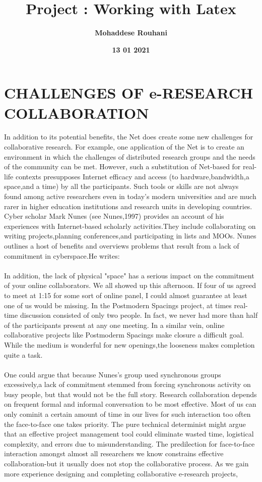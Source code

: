 \documentclass[a4paper,12pt]{article}
\title{\textbf{Project : Working with Latex}}
\author{\textbf{Mohaddese Rouhani}}
\date{\textbf{13 01 2021}}
\begin{document}
	\maketitle 
	\newpage
	\section{CHALLENGES OF e-RESEARCH COLLABORATION}
	In addition to its potential benefits, the Net does create some new challenges for collaborative research. For example, one application of the Net is to create an environment in which the challenges of distributed research groups and the needs of the community can be met. However, such a substitution of Net-based for real-life contexts presupposes Internet efficacy and access (to hardware,bandwidth,a space,and a time) by all the participants. Such tools or skills are not always found among active researchers even in today's modern universities and are much rarer in higher education institutions and research units in developing countries.\\
	Cyber scholar Mark Nunes (see Nunes,1997) provides an account of his experiences with Internet-based scholarly activities.They include collaborating on writing
	projects,planning conferences,and participating in lists and MOOs. Nunes outlines a
	host of benefits and overviews problems that result from a lack of commitment in
	cyberspace.He writes:\\ \\
	In addition, the lack of physical "space" has a serious impact on the commitment of your online collaborators. We all showed up this afternoon. If four of us agreed to meet at 1:15 for some sort of online panel, I could almost guarantee at least one of us would be missing. In the Postmodern Spacings project, at times real-time discussion consisted of only two people. In fact, we never had more than half of the participants present at any one meeting. In a similar vein, online collaborative projects like Postmoderm Spacings make closure a difficult goal. While the medium is wonderful for new openings,the looseness makes completion quite a task.\\ \\
	One could argue that because Nunes's group used synchronous groups excessively,a lack of commitment stemmed from forcing synchronous activity on busy people, but that would not be the full story. Research collaboration depends on frequent formal and informal conversation to be most effective. Most of us can only cominit a certain amount of time in our lives for such interaction too often the face-to-face one takes priority. The pure technical determinist might argue that an effective project management tool could eliminate wasted time, logistical complexity, and errors due to misunderstanding. The predilection for face-to-face interaction amongst almost all researchers we know constrains effective collaboration-but it usually does not stop the collaborative process. As we gain more experience designing and completing collaborative e-research projects,
\end{document}
